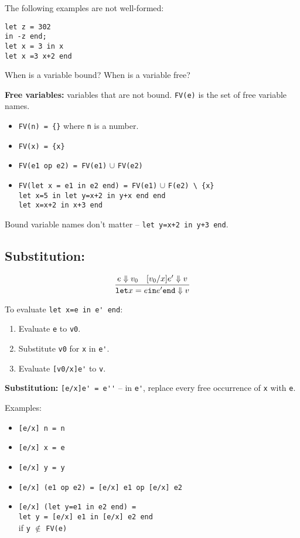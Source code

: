 \documentclass[11pt]{article}
\begin{document}
The following examples are not well-formed:
\begin{verbatim}
let z = 302
in -z end;
let x = 3 in x
let x =3 x+2 end
\end{verbatim}

When is a variable bound? When is a variable free?

\textbf{Free variables:} variables that are not bound. \verb~FV(e)~ is the set of free variable names. 
\begin{itemize}
    \item \verb~FV(n) = {}~ where \verb~n~ is a number.
    \item \verb~FV(x) = {x}~
    \item \verb~FV(e1 op e2) = FV(e1)~ $\cup$ \verb~FV(e2)~
    \item \verb~FV(let x = e1 in e2 end) = FV(e1)~ $\cup$ \verb~F(e2) \ {x}~ \\
        \verb~let x=5 in let y=x+2 in y+x end end~ \\
        \verb~let x=x+2 in x+3 end~
\end{itemize}

Bound variable names don't matter -- \verb~let y=x+2 in y+3 end~.

\subsection{Substitution:} 

\[
    \infer{\verb~let~ x = e \verb~in~ e^{\prime} \verb~end~ \Downarrow v}{
        e \Downarrow v_0
        &
        [v_0/x] e^{\prime} \Downarrow v
    }
\]

To evaluate \verb~let x=e in e' end~:
\begin{enumerate}
    \item Evaluate \verb~e~ to \verb~v0~.
    \item Substitute \verb~v0~ for \verb~x~ in \verb~e'~.
    \item Evaluate \verb~[v0/x]e'~ to \verb~v~.
\end{enumerate}

\textbf{Substitution:} \verb~[e/x]e' = e''~ -- in \verb~e'~, replace every free occurrence of \verb~x~ with \verb~e~.

Examples:
\begin{itemize}
    \item \verb~[e/x] n = n~
    \item \verb~[e/x] x = e~
    \item \verb~[e/x] y = y~
    \item \verb~[e/x] (e1 op e2) = [e/x] e1 op [e/x] e2~
    \item \verb~[e/x] (let y=e1 in e2 end) =~ \\
        \verb~let y = [e/x] e1 in [e/x] e2 end~ \\
        if \verb~y~ $\notin$ \verb~FV(e)~
\end{itemize}
\end{document}
